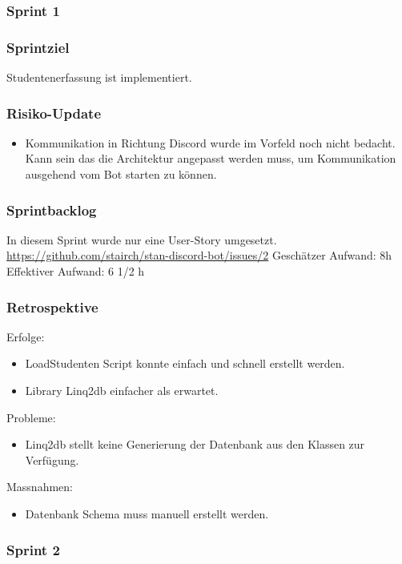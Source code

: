 \documentclass[a4paper, table]{article}
\begin{document}
\subsubsection{Sprint 1}
\subsubsection*{Sprintziel}
Studentenerfassung ist implementiert.

\subsubsection*{Risiko-Update}
\begin{itemize}
    \item Kommunikation in Richtung Discord wurde im Vorfeld noch nicht bedacht.
    Kann sein das die Architektur angepasst werden muss, um Kommunikation ausgehend vom Bot starten zu können.
\end{itemize}

\subsubsection*{Sprintbacklog}
In diesem Sprint wurde nur eine User-Story umgesetzt.\\
\url{https://github.com/stairch/stan-discord-bot/issues/2}
\newline
Geschätzer Aufwand: 8h
\newline
Effektiver Aufwand: 6 1/2 h

\subsubsection*{Retrospektive}
Erfolge:
\begin{itemize}
    \item LoadStudenten Script konnte einfach und schnell erstellt werden.
    \item Library Linq2db einfacher als erwartet.
\end{itemize}
Probleme:
\begin{itemize}
    \item Linq2db stellt keine Generierung der Datenbank aus den Klassen zur Verfügung.
\end{itemize}
Massnahmen:
\begin{itemize}
    \item Datenbank Schema muss manuell erstellt werden.
\end{itemize}
\newpage

\subsubsection{Sprint 2}
\end{document}
